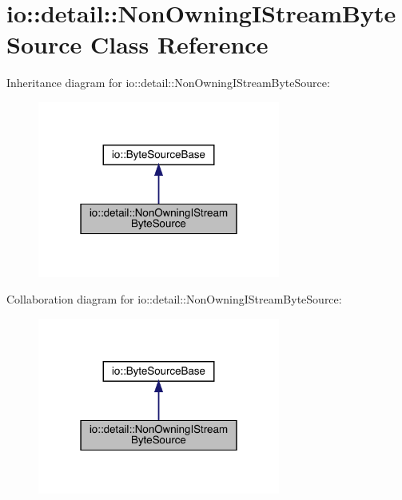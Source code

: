 \hypertarget{classio_1_1detail_1_1_non_owning_i_stream_byte_source}{}\section{io\+:\+:detail\+:\+:Non\+Owning\+I\+Stream\+Byte\+Source Class Reference}
\label{classio_1_1detail_1_1_non_owning_i_stream_byte_source}


Inheritance diagram for io\+:\+:detail\+:\+:Non\+Owning\+I\+Stream\+Byte\+Source\+:\nopagebreak
\begin{figure}[H]
\begin{center}
\leavevmode
\includegraphics[width=226pt]{classio_1_1detail_1_1_non_owning_i_stream_byte_source__inherit__graph}
\end{center}
\end{figure}


Collaboration diagram for io\+:\+:detail\+:\+:Non\+Owning\+I\+Stream\+Byte\+Source\+:\nopagebreak
\begin{figure}[H]
\begin{center}
\leavevmode
\includegraphics[width=226pt]{classio_1_1detail_1_1_non_owning_i_stream_byte_source__coll__graph}
\end{center}
\end{figure}
